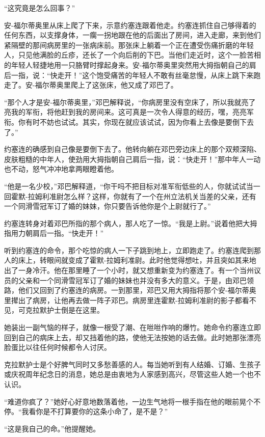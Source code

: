     “这究竟是怎么回事？”

    安-福尔蒂奥里从床上爬了下来，示意约塞连跟着他走。约塞连抓住自己够得着的任何东西，以支撑身体，一瘸一拐地跟在他的后面出了房间，进入走廊，来到他们紧隔壁的那间病房里的一张病床前。那张床上躺着一个正在遭受伤痛折磨的年轻人，只见他满脸的丘疹，还长了一个向后削的下巴。当他们走近时，这个一脸苦相的年轻人轻捷地用一只胳臂时撑起身来。安-福尔蒂奥里突然用大拇指朝自己的肩后一指，说：“快走开！”这个饱受痛苦的年轻人不敢有丝毫怠慢，从床上跳下来跑走了。安-福尔蒂奥里爬上了这张床，他又成了邓巴了。

    “那个人才是安-福尔蒂奥里，”邓巴解释说，“你病房里没有空床了，所以我就亮了亮我的军衔，将他赶到我的房间来。这可真是一次令人得意的经历，嘿，亮亮军衔。你有时不妨也试试。其实，你现在就应该试试，因为你看上去像是要倒下去了。”
 


    约塞连的确感到自己像是要倒下去了。他转向躺在邓巴旁边床上的那个双颊深陷、皮肤粗糙的中年人，使劲用大拇指朝自己肩后一指，说：“快走开！”那中年人一动也不动，怒气冲冲地拿两眼瞪着他。

    “他是一名少校，”邓巴解释道，“你干吗不把目标对准军衔低些的人，你就试试当一回霍默-拉姆利准尉怎么样？这样，你就有了一个在州立法机关当差的父亲，还有一个同滑雪冠军订了婚的妹妹，你只要告诉他你是个上尉就行了。”

    约塞连转身对着邓巴所指的那个病人，那人吃了一惊。“我是上尉。”说着他把大拇指用力朝肩后一指。“快走开！”

    听到约塞连的命令，那个吃惊的病人一下子跳到地上，立即跑走了。约塞连爬到那人的床上，转眼间就变成了霍默-拉姆利准尉。此时他觉得想吐，并且突如其来地出了一身冷汗。他在那里睡了一个小时，就又想重新变为约塞连了。有一个当州议员的父亲和一个同滑雪冠军订了婚的妹妹也并没有多大的意义。于是，由邓巴领路，他们又回到了约塞连的病房。一到那里，邓巴又用大拇指将那个安-福尔蒂奥里撵出了病房，让他再去做一阵子邓巴。病房里连霍默-拉姆利准尉的影子都看不见，可克拉默护士倒是在这里。

    她装出一副气恼的样子，就像一根受了潮、在咝咝作响的爆竹。她命令约塞连立即回到自己的病床上去，却又挡着他的路，使他无法按她的话去做。此时她那张漂亮脸蛋比以往任何时候都令人讨厌。

    克拉默护士是个好脾气同时又多愁善感的人。每当她听到有人结婚、订婚、生孩子或庆祝周年纪念日的消息，她总是由衷地为人家感到高兴，尽管这些人她一个也不认识。

    “难道你疯了？”她好心好意地数落着他，一边生气地将一根手指在他的眼前晃个不停。“我看你是不打算要你的这条小命了，是不是？”

    “这是我自己的命。”他提醒她。

